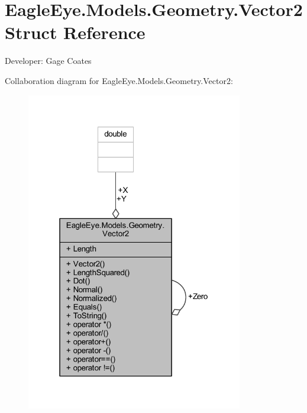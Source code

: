 \hypertarget{struct_eagle_eye_1_1_models_1_1_geometry_1_1_vector2}{}\section{Eagle\+Eye.\+Models.\+Geometry.\+Vector2 Struct Reference}
\label{struct_eagle_eye_1_1_models_1_1_geometry_1_1_vector2}


Developer\+: Gage Coates  




Collaboration diagram for Eagle\+Eye.\+Models.\+Geometry.\+Vector2\+:
\nopagebreak
\begin{figure}[H]
\begin{center}
\leavevmode
\includegraphics[width=268pt]{struct_eagle_eye_1_1_models_1_1_geometry_1_1_vector2__coll__graph}
\end{center}
\end{figure}
